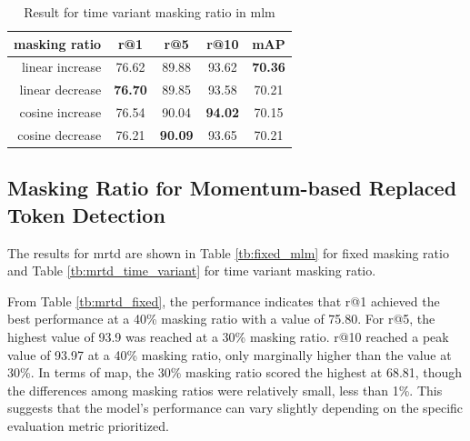 \begin{table}[htbp]
  \centering
  \caption{Result for time variant masking ratio in \acrshort{mlm}}
  \label{tb:time_variant_mlm}
  \begin{tabular}{rcccc}
    \centering
    masking ratio & r@1 & r@5 & r@10 & mAP\\ \hline
    linear increase & 76.62 & 89.88 & 93.62 & \textbf{70.36} \\
    linear decrease & \textbf{76.70} & 89.85 & 93.58 & 70.21 \\
    cosine increase & 76.54 & 90.04 & \textbf{94.02} & 70.15 \\
    cosine decrease & 76.21 & \textbf{90.09} & 93.65 & 70.21 \\
  \end{tabular}
\end{table}


\subsection{Masking Ratio for Momentum-based Replaced Token Detection}



The results for \acrshort{mrtd} are shown in Table \ref{tb:fixed_mlm} for fixed masking ratio and Table \ref{tb:mrtd_time_variant} for time variant masking ratio.

From Table \ref{tb:mrtd_fixed}, the performance indicates that r@1 achieved the best performance at a 40\% masking ratio with a value of 75.80. For r@5, the highest value of 93.9 was reached at a 30\% masking ratio. r@10 reached a peak value of 93.97 at a 40\% masking ratio, only marginally higher than the value at 30\%. In terms of \acrshort{map}, the 30\% masking ratio scored the highest at 68.81, though the differences among masking ratios were relatively small, less than 1\%. This suggests that the model's performance can vary slightly depending on the specific evaluation metric prioritized.

